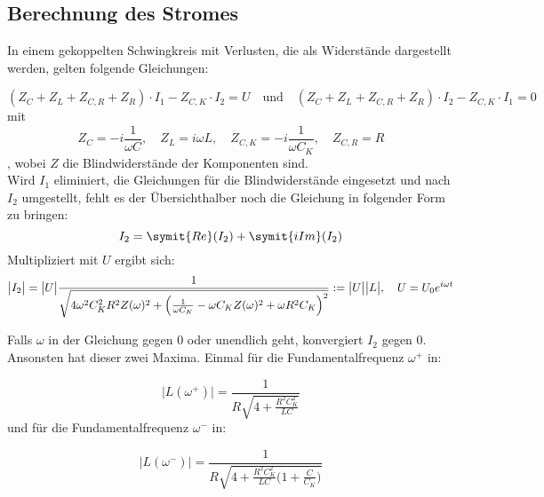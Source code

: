 
\subsection{Berechnung des Stromes}

In einem gekoppelten Schwingkreis mit Verlusten, die als Widerstände dargestellt werden, gelten folgende Gleichungen:

\begin{equation}
(Z_C + Z_L + Z_{C,R} + Z_R)\cdot I_1 - Z_{C,K}\cdot I_2 = U
\quad\textrm{und}\quad
(Z_C + Z_L + Z_{C,R} + Z_R)\cdot I_2 - Z_{C,K}\cdot I_1 = 0
\end{equation}
mit
\begin{equation}
Z_C = -i\frac{1}{\omega C},\quad Z_L = i\omega L,\quad Z_{C,K} = -i\frac{1}{\omega C_K},\quad Z_{C,R}=R
\end{equation}
, wobei \(Z\) die Blindwiderstände der Komponenten sind.\\
Wird \(I_1\) eliminiert, die Gleichungen für die Blindwiderstände eingesetzt und nach \(I_2\) umgestellt, fehlt es der Übersichthalber noch die Gleichung in folgender Form zu bringen:
\begin{equation}
I_2 = \symit{Re}(I_2)+\symit{iIm}(I_2)  
\end{equation}
Multipliziert mit \(U\) ergibt sich:
\begin{equation}
    \bigl|I_2\bigr| = \bigl|U\bigr| \frac{1}{\sqrt{4\omega^2C_K^2R^2Z(\omega)^2+\Bigl(\frac{1}{\omega C_K}-\omega C_KZ(\omega)^2+\omega R^2C_K\Bigr)^2}} := \bigl|U\bigr| \bigl|L\bigr|, \quad U = U_0 e^{i\omega t}
\end{equation}

Falls \(\omega\) in der Gleichung gegen 0 oder unendlich geht, konvergiert \(I_2\) gegen 0. Ansonsten hat dieser zwei Maxima. Einmal für die Fundamentalfrequenz $\omega^{+}$ in:

\begin{equation}
   \bigl|L(\omega^+)\bigr| = \frac{1}{R\sqrt{4+\frac{R^2C_K^2}{LC}}}
   \label{eq:strom+}
\end{equation}
und für die Fundamentalfrequenz $\omega^{-}$ in:

\begin{equation}
    \bigl|L(\omega^-)\bigr| = \frac{1}{R\sqrt{4+\frac{R^2C_K^2}{LC}\biggl(1+\frac{C}{C_K}\biggr)}}
    \label{eq:strom-}
\end{equation}